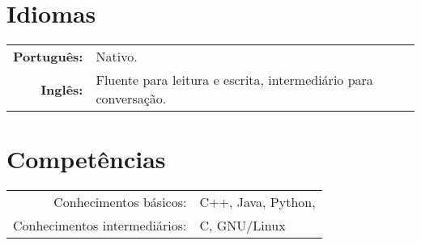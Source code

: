 \documentclass[a4paper,10pt]{article} %
\begin{document}

\section{Idiomas}

\begin{tabular}{rl}
  \textbf{Português:} & Nativo.\\
  \textbf{Inglês:} & Fluente para leitura e escrita, intermediário para conversação.\\
\end{tabular}


\section{Competências}

\begin{tabular}{rl}
  Conhecimentos básicos: & C++, Java, Python, \setmainfont{cmr10}{\fb \LaTeX} \setmainfont[SmallCapsFont=Fontin SmallCaps]{Fontin Sans}
  \\

  Conhecimentos intermediários: & C, GNU/Linux \\
\end{tabular}
\end{document}
